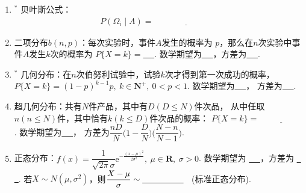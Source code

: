 \documentclass{article}
\newif\ifte
\newcommand{\e}{\mathrm{e}}
\renewcommand\leq\leqslant
\begin{document}
\begin{multicols}{2}
\begin{enumerate}[leftmargin=20pt]
\item $^*$ 贝叶斯公式：
\begin{gather*}
    P(\varOmega_{i} \mid A)=\underline{\ \ifte 
    \dfrac{P(A \mid \varOmega_{i}) 
    P(\varOmega_{i})}{\sum\limits_{k=1}^{n} P(A \mid 
    \varOmega_{k}) P(\varOmega_{k})} \else \hspace{3cm} \fi\ }
\end{gather*}

\item 二项分布$ b(n,p) $：每次实验时，事件$ A $发生的概率为
$ p $，那么在$ n $次实验中事件$ A $发生$ k $次的概率为
$ P\{X=k\}= $\underline{\ \ifte $ C_n^kp^k(1-p)^{n-k} $
    \else \hspace{2cm} \fi\ }. 数学期望为\underline{\ \ifte 
$ np $ \else \hspace{1cm} \fi\ }，方差为\underline{\ \ifte 
$ np(1-p) $ \else \hspace{2cm} \fi\ }. 

\item $^*$ 几何分布：在$ n $次伯努利试验中，试验$ k $次才得到第一次成功的概率，$ P\{X=k\}=(1-p)^{k-1}p ,\ k\in \textbf{N}^+,\ 0<p<1 $. 
数学期望为\underline{\ \ifte $ \dfrac{1}{p} $\else \hspace{1cm} \fi\ }，
方差为\underline{\ \ifte $ \dfrac{1-p}{p^2} $\else \hspace{2cm} \fi\ }. 

\item 超几何分布：共有$ N $件产品，其中有$ D (D\leq N) $件次品，
从中任取$ n(n\leq N)$件，其中恰有$ k(k\leq D) $件次品的概率：
$ P\{X=k\}=\underline{\ \ifte \dfrac{C_D^kC_{N-D}^{n-k}}{C_N^n}
\else \hspace{2cm} \fi\ } $. 数学期望为\underline{\ \ifte 
$ \dfrac{nD}{N} $\else \hspace{1cm} \fi\ }，
方差为$ \dfrac{nD}{N}\Big(1-\dfrac{D}{N}
\Big)\Big(\dfrac{N-n}{N-1}\Big) $.

\item 正态分布：$ f(x)=\dfrac{1}{\sqrt{2\pi}\sigma}\e^{-\frac{(x-\mu)^2}
    {2\sigma^2}},\ \mu \in \textbf{R},\ \sigma>0 $. 数学期望为
\underline{\ \ifte $ \mu $\else \hspace{1cm} \fi\ }，方差为
\underline{\ \ifte $ \sigma^2 $\else \hspace{1cm} \fi\ }. 
若$ X\sim N(\mu,\sigma^2) $，则$ \dfrac{X-\mu}{\sigma}
\sim \underline{\ \ifte N(0,1)\else \hspace{1.5cm} \fi\ } $
\ (标准正态分布). 


\end{enumerate}
\end{multicols}
\end{document}
